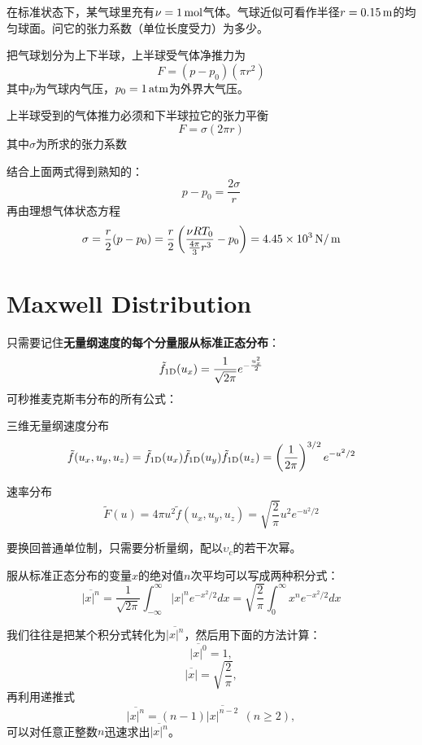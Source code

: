 \documentclass[CJK]{beamer}
\begin{document}
\begin{frame}
  \chtitle{\proid (\stwo)}
  \bch
  在标准状态下，某气球里充有$\nu=1\,\mathrm{mol}$气体。气球近似可看作半径$r=0.15\,\mathrm{m}$的均匀球面。问它的张力系数（单位长度受力）为多少。
  \ech
\end{frame}

\begin{frame}
  \bch
  {\small
  把气球划分为上下半球，上半球受气体净推力为
  $$F=(p -p_0)(\pi r^2)$$
  其中$p$为气球内气压，$p_0=1\,\mathrm{atm}$为外界大气压。

  上半球受到的气体推力必须和下半球拉它的张力平衡
  $$ F = \sigma (2\pi r)$$
  其中$\sigma$为所求的张力系数

  结合上面两式得到熟知的：
  $$ p-p_0 = \frac{2\sigma}{r} $$
  再由理想气体状态方程
  $$\sigma = \frac{r}{2}(p-p_0) = \frac{r}{2}\left(\frac{\nu R T_0}{\frac{4\pi}{3}r^3} - p_0\right) = 4.45\times 10^3 \,\mathrm{N}/\,\mathrm{m} $$

  }
  \ech
\end{frame}


\section{Maxwell Distribution}

\setcounter{chap}{2}
\setcounter{problem}{0}

\begin{frame}
  \bch
  {\small
  只需要记住{\bf 无量纲速度的每个分量服从标准正态分布}：
  $$\tilde{f}_{\rm 1D}(u_x) = \frac{1}{\sqrt{2\pi}}e^{-\frac{u_x^2}{2}}$$
  可秒推麦克斯韦分布的所有公式：
  
  三维无量纲速度分布
  $$ \tilde{f}(u_x, u_y, u_z) = \tilde{f}_{\rm 1D}(u_x)\tilde{f}_{\rm 1D}(u_y)\tilde{f}_{\rm 1D}(u_z) =\left(\frac{1}{2\pi}\right)^{3/2}e^{-u^2/2}$$
  
  速率分布
  $$ \tilde{F}(u) = 4\pi u^2 \tilde{f}(u_x, u_y, u_z) = \sqrt{\frac{2}{\pi}}u^2e^{-u^2/2}$$

  要换回普通单位制，只需要分析量纲，配以$\upsilon_c$的若干次幂。}
  \ech
\end{frame}


\begin{frame}
  \bch
  {\small
  服从标准正态分布的变量$x$的绝对值$n$次平均可以写成两种积分式：
  $$\overline{|x|^n}=\frac{1}{\sqrt{2\pi}}\int_{-\infty}^\infty |x|^n e^{-x^2/2}dx = \sqrt{\frac{2}{\pi}}\int_0^\infty x^n e^{-x^2/2}dx $$

  我们往往是把某个积分式转化为$\overline{|x|^n}$，然后用下面的方法计算：
  $$\overline{|x|^0} = 1,$$
  $$\overline{|x|} = \sqrt{\frac{2}{\pi}},$$
  再利用递推式
  $$\overline{|x|^n} = (n-1) \overline{|x|^{n-2}}\ \  (n\ge 2),$$
  可以对任意正整数$n$迅速求出$\overline{|x|^n}$。
  }
  \ech
\end{frame}
\end{document}
